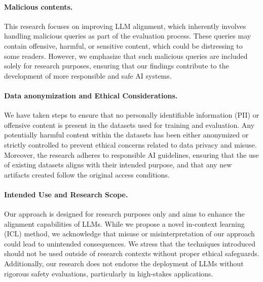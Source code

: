 \paragraph{Malicious contents.} This research focuses on improving LLM alignment, which inherently involves handling malicious queries as part of the evaluation process. These queries may contain offensive, harmful, or sensitive content, which could be distressing to some readers. However, we emphasize that such malicious queries are included solely for research purposes, ensuring that our findings contribute to the development of more responsible and safe AI systems.

\paragraph{Data anonymization and Ethical Considerations.} We have taken steps to ensure that no personally identifiable information (PII) or offensive content is present in the datasets used for training and evaluation. Any potentially harmful content within the datasets has been either anonymized or strictly controlled to prevent ethical concerns related to data privacy and misuse. Moreover, the research adheres to responsible AI guidelines, ensuring that the use of existing datasets aligns with their intended purpose, and that any new artifacts created follow the original access conditions.

\paragraph{Intended Use and Research Scope.} Our approach is designed for research purposes only and aims to enhance the alignment capabilities of LLMs. While we propose a novel in-context learning (ICL) method, we acknowledge that misuse or misinterpretation of our approach could lead to unintended consequences. We stress that the techniques introduced should not be used outside of research contexts without proper ethical safeguards. Additionally, our research does not endorse the deployment of LLMs without rigorous safety evaluations, particularly in high-stakes applications.